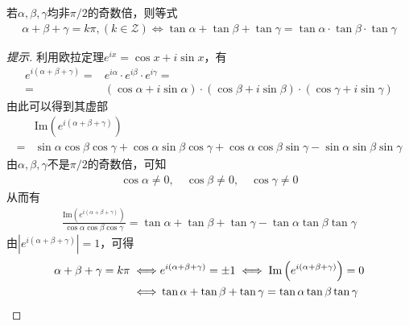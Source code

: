 \begin{theorem}\label{th:tan-x+y+z=k.pi}
  若$\alpha, \beta, \gamma$均非$\pi/2$的奇数倍，则等式
  \begin{align*}
    \alpha+\beta+\gamma = k\pi,(k\in\mathcal{Z}) \iff
    \tan\alpha +\tan\beta+\tan\gamma=\tan\alpha \cdot \tan\beta \cdot \tan\gamma
  \end{align*}
\end{theorem}
\begin{proof}[提示]
  利用欧拉定理$e^{ix} = \cos x + i \sin x$，有
  \begin{align*}
    e^{i(\alpha + \beta + \gamma)} ={}& e^{i\alpha}\cdot e^{i\beta}\cdot e^{i\gamma} =\\
    ={}& (\cos\alpha + i\sin\alpha) \cdot (\cos\beta + i\sin\beta) \cdot (\cos\gamma + i\sin\gamma)
  \end{align*}
  由此可以得到其虚部
  \begin{align*}
    &\mathrm{Im}\left(e^{i(\alpha + \beta + \gamma)}\right) \\
    ={}& \sin\alpha\cos\beta\cos\gamma + \cos\alpha\sin\beta\cos\gamma + \cos\alpha\cos\beta\sin\gamma - \sin\alpha\sin\beta\sin\gamma
  \end{align*}
  由$\alpha,\beta,\gamma$不是$\pi/2$的奇数倍，可知
  \begin{align*}
    \cos\alpha\ne0,\quad \cos\beta\ne0,\quad \cos\gamma\ne0
  \end{align*}
  从而有
  \begin{align*}
    \frac{\mathrm{Im}\left(e^{i(\alpha + \beta + \gamma)}\right)}{\cos\alpha\cos\beta\cos\gamma}
    = \tan\alpha + \tan\beta + \tan\gamma - \tan\alpha\tan\beta\tan\gamma
  \end{align*}
  由$\left| e^{i(\alpha + \beta + \gamma)} \right| = 1$，可得
  \begin{align*}
    \alpha + \beta + \gamma = k\pi \iff &
    e^{i(\alpha + \beta + \gamma)} = \pm 1 
    \iff \mathrm{Im}\left(e^{i(\alpha + \beta + \gamma)}\right) = 0\\
    \iff & \tan\alpha + \tan\beta + \tan\gamma = \tan\alpha\tan\beta\tan\gamma\qedhere
  \end{align*}


\end{proof}

